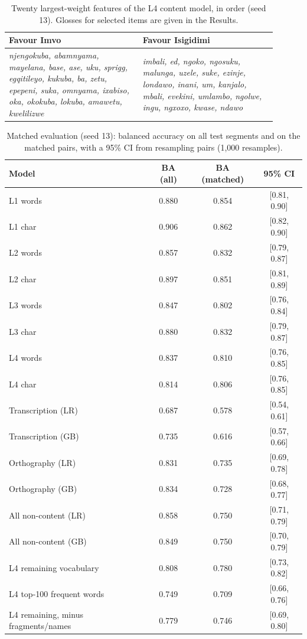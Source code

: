 \begin{table}[h]\centering\small\caption{Twenty largest-weight features of the L4 content model, in order (seed 13). Glosses for selected items are given in the Results.}
\begin{tabular}{@{}p{0.45\linewidth}p{0.45\linewidth}@{}}\toprule Favour Imvo & Favour Isigidimi \\ \midrule
\emph{njengokuba, abamnyama, mayelana, base, ase, uku, sprigg, egqitileyo, kukuba, ba, zetu, epepeni, suka, omnyama, ixabiso, oka, okokuba, lokuba, amawetu, kwelilizwe} & \emph{imbali, ed, ngoko, ngosuku, malunga, uzele, suke, ezinje, londawo, inani, um, kanjalo, mbali, evekini, umlambo, ngolwe, ingu, ngxoxo, kwase, ndawo} \\
\bottomrule\end{tabular}\label{tab:s5}\end{table}
\begin{table}[h]\centering\small\caption{Matched evaluation (seed 13): balanced accuracy on all test segments and on the matched pairs, with a 95\% CI from resampling pairs (1{,}000 resamples).}
\begin{tabular}{@{}lccc@{}}\toprule Model & BA (all) & BA (matched) & 95\% CI \\ \midrule
L1 words & 0.880 & 0.854 & [0.81, 0.90] \\
L1 char & 0.906 & 0.862 & [0.82, 0.90] \\
L2 words & 0.857 & 0.832 & [0.79, 0.87] \\
L2 char & 0.897 & 0.851 & [0.81, 0.89] \\
L3 words & 0.847 & 0.802 & [0.76, 0.84] \\
L3 char & 0.880 & 0.832 & [0.79, 0.87] \\
L4 words & 0.837 & 0.810 & [0.76, 0.85] \\
L4 char & 0.814 & 0.806 & [0.76, 0.85] \\
Transcription (LR) & 0.687 & 0.578 & [0.54, 0.61] \\
Transcription (GB) & 0.735 & 0.616 & [0.57, 0.66] \\
Orthography (LR) & 0.831 & 0.735 & [0.69, 0.78] \\
Orthography (GB) & 0.834 & 0.728 & [0.68, 0.77] \\
All non-content (LR) & 0.858 & 0.750 & [0.71, 0.79] \\
All non-content (GB) & 0.849 & 0.750 & [0.70, 0.79] \\
L4 remaining vocabulary & 0.808 & 0.780 & [0.73, 0.82] \\
L4 top-100 frequent words & 0.749 & 0.709 & [0.66, 0.76] \\
L4 remaining, minus fragments/names & 0.779 & 0.746 & [0.69, 0.80] \\
\bottomrule\end{tabular}\label{tab:matched}\end{table}
